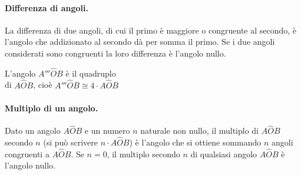 \begin{inaccessibleblock}
\begin{center}\end{center}
\end{inaccessibleblock}

\begin{minipage}{.39\textwidth}
 \paragraph{Differenza di angoli.} La differenza di due angoli, di cui 
il primo è maggiore o congruente al secondo, è l'angolo che 
addizionato al secondo dà per somma il primo. 
Se i due angoli considerati sono congruenti la loro differenza è 
l'angolo nullo.
\end{minipage}
\begin{minipage}{.59\textwidth}
 \begin{inaccessibleblock}
\begin{center}\end{center}
\end{inaccessibleblock}
\end{minipage}
\vspace{5mm}
\begin{minipage}{.59\textwidth}
\begin{inaccessibleblock}
\begin{center}\end{center}
\end{inaccessibleblock}
L'angolo \(A'''\widehat{O}B\) è il quadruplo\\
di \(A\widehat{O}B\), cioè \(A'''\widehat{O}B \cong 4\cdot 
A\widehat{O}B\)
 \end{minipage}
\begin{minipage}{.39\textwidth}
\paragraph{Multiplo di un angolo.} Dato un angolo \(A\widehat{O}B\) e 
un numero \(n\) naturale non nullo, il multiplo di \(A\widehat{O}B\) 
secondo \(n\) (si può scrivere \(n\cdot A\widehat{O}B\)) è l'angolo che 
si ottiene sommando \(n\) angoli congruenti a \(A\widehat{O}B\). Se 
\(n=0\), il multiplo secondo \(n\) di qualsiasi angolo \(A\widehat{O}B\) è 
l'angolo nullo.
\end{minipage}


